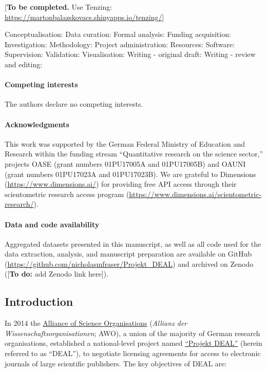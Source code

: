 \documentclass[
]{article}
\begin{document}
{[}\textbf{To be completed.} Use Tenzing: \url{https://martonbalazskovacs.shinyapps.io/tenzing/}{]}

Conceptualisation:
Data curation:
Formal analysis:
Funding acquisition:
Investigation:
Methodology:
Project administration:
Resources:
Software:
Supervision:
Validation:
Visualisation:
Writing - original draft:
Writing - review and editing:

\hypertarget{competing-interests}{%
\paragraph{Competing interests}\label{competing-interests}}

The authors declare no competing interests.

\hypertarget{acknowledgments}{%
\paragraph{Acknowledgments}\label{acknowledgments}}

This work was supported by the German Federal Ministry of Education and Research within the
funding stream ``Quantitative research on the science sector,'' projects OASE (grant numbers 01PU17005A and 01PU17005B) and OAUNI (grant numbers 01PU17023A and 01PU17023B). We are grateful to Dimensions (\url{https://www.dimensions.ai/}) for providing free API access through their scientometric research access program (\url{https://www.dimensions.ai/scientometric-research/}).

\hypertarget{data-and-code-availability}{%
\paragraph{Data and code availability}\label{data-and-code-availability}}

Aggregated datasets presented in this manuscript, as well as all code used for the data extraction, analysis, and manuscript preparation are available on GitHub (\url{https://github.com/nicholasmfraser/Projekt_DEAL}) and archived on Zenodo ({[}\textbf{To do:} add Zenodo link here{]}).

\pagebreak

\hypertarget{introduction}{%
\subsection{Introduction}\label{introduction}}

In 2014 the \href{https://wissenschaftsfreiheit.de/}{Alliance of Science Organisations} (\emph{Allianz der Wissenschaftsorganisationen}; AWO), a union of the majority of German research organisations, established a national-level project named \href{https://www.projekt-deal.de}{``Projekt DEAL''} (herein referred to as ``DEAL''), to negotiate licensing agreements for access to electronic journals of large scientific publishers. The key objectives of DEAL are:
\end{document}
